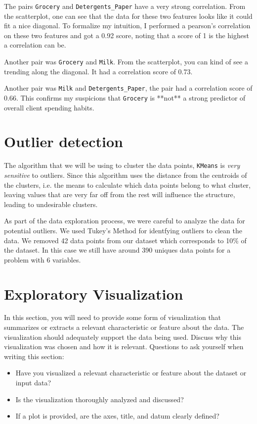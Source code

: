 \documentclass[twoside,openright,titlepage,numbers=noenddot,headinclude,%
               footinclude=true,cleardoublepage=empty,abstractoff,BCOR=5mm,%
               paper=a4,fontsize=11pt,ngerman,american]{scrreprt}
\numberwithin{theorem}{chapter}
\numberwithin{definition}{chapter}
\numberwithin{algorithm}{chapter}
\numberwithin{figure}{chapter}
\numberwithin{table}{chapter}
\numberwithin{equation}{chapter}
\begin{document}
The pairs \texttt{Grocery} and \texttt{Detergents\_Paper} have a very strong correlation. From the scatterplot, one can see that the data for these two features looks like it could fit a nice diagonal. To formalize my intuition, I performed a pearson's correlation on these two features and got a 0.92 score, noting that a score of 1 is the highest a correlation can be.

Another pair was \texttt{Grocery} and \texttt{Milk}. From the scatterplot, you can kind of see a trending along the diagonal. It had a correlation score of 0.73.

Another pair was \texttt{Milk} and \texttt{Detergents\_Paper}, the pair had a correlation score of 0.66. This confirms my suspicions that \texttt{Grocery} is **not** a strong predictor of overall client spending habits.




\section*{Outlier detection}
The algorithm that we will be using to cluster the data points, \texttt{KMeans} is \emph{very sensitive} to outliers. Since this algorithm uses the distance from the centroids of the clusters, i.e. the means to calculate which data points belong to what cluster, leaving values that are very far off from the rest will influence the structure, leading to undesirable clusters.

As part of the data exploration process, we were careful to analyze the data for potential outliers. We used Tukey's Method for identfying outliers to clean the data. We removed 42 data points from our dataset which corresponds to 10\% of the dataset. In this case we still have around 390 uniques data points for a problem with 6 variables. 



\section*{Exploratory Visualization}

In this section, you will need to provide some form of visualization that summarizes or extracts a relevant characteristic or feature about the data. The visualization should adequately support the data being used. Discuss why this visualization was chosen and how it is relevant. Questions to ask yourself when writing this section:
\begin{itemize}%
\item Have you visualized a relevant characteristic or feature about the dataset or input data?
\item Is the visualization thoroughly analyzed and discussed?
\item If a plot is provided, are the axes, title, and datum clearly defined?
\end{itemize}
\end{document}
